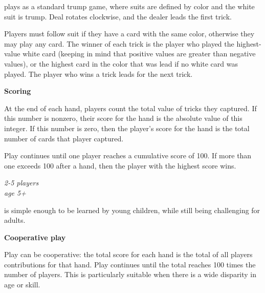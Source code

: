 \documentclass[11pt]{article}
\newcommand\myssection[1]{\begin{center}\bf\small\noindent #1\end{center}}
\begin{document}
 plays as a standard trump game, where suits
are defined by color and the white suit is trump.  Deal rotates
clockwise, and the dealer leads the first trick.

Players must follow suit if they have a card with the same color,
otherwise they may play any card.  The winner of each trick is the
player who played the highest-value white card (keeping in mind that
positive values are greater than negative values), or the highest
card in the color that was lead if no white card was played.  The player
who wins a trick leads for the next trick.

\clearpage
{}

\myssection{Scoring} At the end of each hand, players count the
total value of tricks they captured.  If this number is nonzero, their
score for the hand is the absolute value of this integer.  If this
number is zero, then the player's score for the hand is the total
number of cards that player captured.

Play continues until one player reaches a cumulative score of 100.  If
more than one exceeds 100 after a hand, then the player with the
highest score wins.

\clearpage
{}

\vspace{-0.1in}
\begin{center}
  \em 2-5 players\\
  age 5+
\end{center}

 is simple enough to be learned by young
children, while still being challenging for adults.

\myssection{Cooperative play} Play can be cooperative: the total score
for each hand is the total of all players contributions for that hand.
Play continues until the total reaches 100 times the number of
players.  This is particularly suitable when there is a wide disparity
in age or skill.
\end{document}
